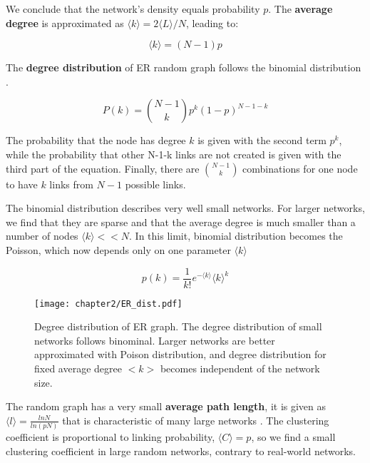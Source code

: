 We conclude that the network's density equals probability $p$.
The \textbf{average degree} is approximated as $\langle k \rangle = 2 \langle L \rangle / N $, leading to:

\begin{equation}
\langle k \rangle = (N-1)p 
\end{equation}

The \textbf{degree distribution} of ER random graph follows the binomial distribution \cite{barabasi2016network}. 

\begin{equation}
P(k) = \binom{N-1}{k}p^k(1-p)^{N-1-k}
\end{equation}

The probability that the node has degree $k$ is given with the second term $p^k$, while the probability that other N-1-k links are not created is given with the third part of the equation. Finally, there are  $\binom{N-1}{k}$ combinations for one node to have $k$ links from $N-1$ possible links. 

The binomial distribution describes very well small networks. For larger networks, we find that they are sparse and that the average degree is much smaller than a number of nodes $\langle k \rangle << N$. In this limit, binomial distribution becomes the Poisson, which now depends only on one parameter $\langle k \rangle$

\begin{equation}
p(k) = \frac{1}{k!}e^{-\langle k \rangle}\langle k \rangle^{k}
\end{equation}

\begin{figure}[H]
	\centering
	\texttt{[image: chapter2/ER\_dist.pdf]}
	\caption[Degree distribution of Erdős-R\' {e}nyi graph.]{Degree distribution of ER graph. The degree distribution of small networks follows binominal. Larger networks are better approximated with Poison distribution, and degree distribution for fixed average degree $<k>$ becomes independent of the network size.}
	\label{fig:erdist}
\end{figure}

The random graph has a very small \textbf{average path length}, it is given as $\langle l \rangle = \frac{ln N}{ln(pN)}$ that is characteristic of many large networks \cite{bollobas2003mathematical}. The clustering coefficient is proportional to linking probability, $\langle C \rangle = p$, so we find a small clustering coefficient in large random networks, contrary to real-world networks.  %

